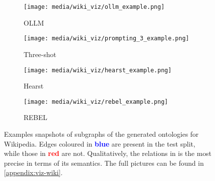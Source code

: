 \begin{figure}[t]
    \centering
    \begin{subfigure}[c]{0.48\textwidth}
        \centering
        \texttt{[image: media/wiki\_viz/ollm\_example.png]}
        \caption{OLLM}
        \label{fig:wiki-examples:ollm}
    \end{subfigure}%
    \hfill%
    \begin{subfigure}[c]{0.48\textwidth}
        \centering
        \texttt{[image: media/wiki\_viz/prompting\_3\_example.png]}
        \caption{Three-shot}
        \label{fig:wiki-examples:prompting}
    \end{subfigure}%
    \hfill%
    \begin{subfigure}[c]{0.48\textwidth}
        \centering
        \texttt{[image: media/wiki\_viz/hearst\_example.png]}
        \caption{Hearst}
    \end{subfigure}%
    \hfill%
    \begin{subfigure}[c]{0.48\textwidth}
        \centering
        \texttt{[image: media/wiki\_viz/rebel\_example.png]}
        \caption{REBEL}
    \end{subfigure}%
    \caption{Examples snapshots of subgraphs of the generated ontologies for Wikipedia. Edges coloured in \textcolor{blue}{\textbf{blue}} are present in the test split, while those in \textcolor{red}{\textbf{red}} are not. Qualitatively, the relations in \name is the most precise in terms of its semantics. The full pictures can be found in \cref{appendix:viz-wiki}.}
    \label{fig:wiki-examples}
\end{figure}